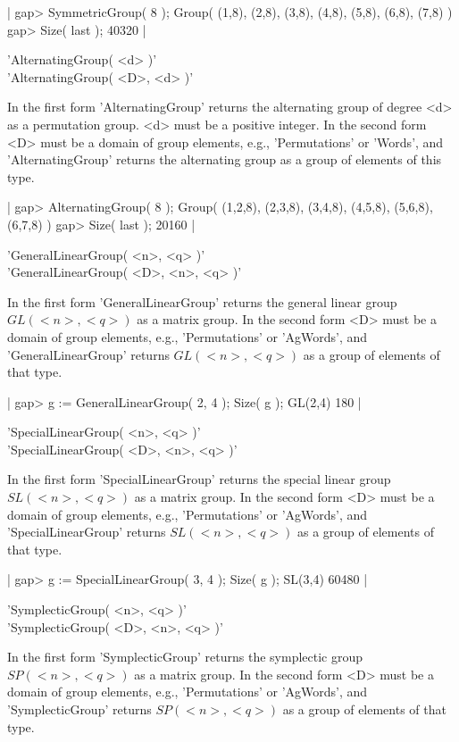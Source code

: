 |    gap> SymmetricGroup( 8 );
    Group( (1,8), (2,8), (3,8), (4,8), (5,8), (6,8), (7,8) )
    gap> Size( last );
    40320 |

\vspace{5mm}
'AlternatingGroup( <d> )'%
 \\
'AlternatingGroup( <D>, <d> )'

In the  first  form  'AlternatingGroup' returns the alternating  group of
degree <d> as a permutation group.  <d> must be a  positive integer.   In
the  second  form  <D>  must  be  a  domain  of  group   elements,  e.g.,
'Permutations' or 'Words', and 'AlternatingGroup' returns the alternating
group as a group of elements of this type.

|    gap> AlternatingGroup( 8 );
    Group( (1,2,8), (2,3,8), (3,4,8), (4,5,8), (5,6,8), (6,7,8) )
    gap> Size( last );
    20160 |

\vspace{5mm}
'GeneralLinearGroup( <n>, <q> )'%
 \\
'GeneralLinearGroup( <D>, <n>, <q> )'

In the first  form 'GeneralLinearGroup' returns the general  linear group
$GL(  <n>, <q> )$ as a  matrix group.  In the second form <D>  must  be a
domain  of  group  elements,  e.g.,  'Permutations'  or  'AgWords',   and
'GeneralLinearGroup' returns $GL( <n>,  <q>  )$ as a group of elements of
that type.

|    gap> g := GeneralLinearGroup( 2, 4 ); Size( g );
    GL(2,4)
    180 |

\vspace{5mm}
'SpecialLinearGroup( <n>, <q> )'%
 \\
'SpecialLinearGroup( <D>, <n>, <q> )'

In the first form 'SpecialLinearGroup' returns  the special  linear group
$SL( <n>, <q>  )$ as a matrix group.   In the second form  <D> must  be a
domain  of  group  elements,  e.g.,  'Permutations'   or  'AgWords',  and
'SpecialLinearGroup' returns $SL(  <n>, <q> )$ as a  group of elements of
that type.

|    gap> g := SpecialLinearGroup( 3, 4 ); Size( g );
    SL(3,4)
    60480 |

\vspace{5mm}
'SymplecticGroup( <n>, <q> )'%
 \\
'SymplecticGroup( <D>, <n>, <q> )'

In the  first  form 'SymplecticGroup'  returns the symplectic  group $SP(
<n>,  <q> )$ as a  matrix group.  In the second form <D> must be a domain
of    group   elements,   e.g.,    'Permutations'   or   'AgWords',   and
'SymplecticGroup' returns $SP( <n>, <q> )$ as a group of elements of that
type.

